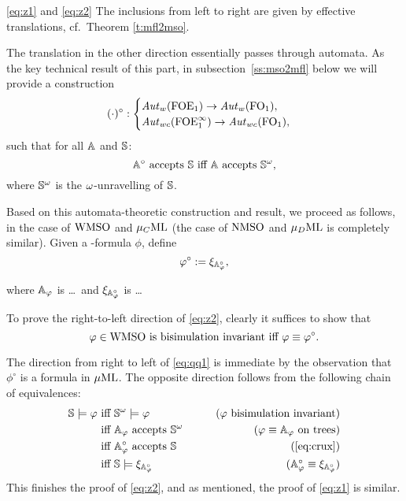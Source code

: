 \begin{proofof}{\eqref{eq:z1} and \eqref{eq:z2}}
The inclusions from left to right are given by effective translations,
cf.~Theorem \ref{t:mfl2mso}.

The translation in the other direction essentially passes through automata.
As the key technical result of this part, in subsection~\ref{ss:mso2mfl} below
we will provide a construction 
\[(\cdot)^{\circ}: \begin{cases} \mathit{Aut}_{w}(\mathrm{FOE}_1) \to
\mathit{Aut}_{w}(\mathrm{FO}_1), \\
\mathit{Aut}_{wc}(\mathrm{FOE}^{\infty}_1) \to
\mathit{Aut}_{wc}(\mathrm{FO}_1), \\
\end{cases}\] 
such that for all $\mathbb{A}$ and $\mathbb{S}$: %
\begin{equation}
\label{eq:crux}
\bbA^{\circ} \text{ accepts } \model \text{ iff } \bbA \text{ accepts
} \model^{\om},
\end{equation}
where $\mathbb{S}^{\omega}$ is the $\omega$-unravelling of $\mathbb{S}$.
 
Based on this automata-theoretic construction and result, we proceed as follows,
in the case of $\mathrm{WMSO}$ and $\mu_{C}\mathrm{ML}$ (the case of $\mathrm{NMSO}$ and $\mu_{D}\mathrm{ML}$ is 
completely similar).
Given a \wmso-formula $\phi$, define 
\[
\varphi^{\circ} \mathrel{: =} \xi_{\mathbb{A}_{\varphi}^{\circ}},
\]
\btbs
\item
where $\mathbb{A}_{\varphi}$ is \ldots\ and $\xi_{\mathbb{A}_{\varphi}^{\circ}}$ is \ldots
\etbs

To prove the right-to-left direction of \eqref{eq:z2}, clearly it suffices to
show that
\begin{equation}
\label{eq:qq1}
\phi\in\wmso \text{ is bisimulation invariant iff } \phi \equiv \phi^{\circ}.
\end{equation}

The direction from right to left of \eqref{eq:qq1} is immediate by the 
observation that $\phi^{\circ}$ is a formula in $\mu\mathrm{ML}$.
The opposite direction follows from the following chain of equivalences:
\begin{align*}
\model \models \phi
  & \text{ iff } \model^{\om} \models \phi
  & \tag{$\phi$ bisimulation invariant}
\\ & \text{ iff }  \bbA_{\phi} \text{ accepts } \model^{\om}
  & \tag{$ \phi \equiv \aut_{\phi}$ on trees}
\\ & \text{ iff } \bbA_{\phi}^{\circ} \text{ accepts } \model
& \tag{\ref{eq:crux}}
\\ & \text{ iff }  \model \models \xi_{ \aut_{\phi}^{\circ}}
& \tag{$\aut_{\phi}^{\circ}\equiv \xi_{ \aut_{\phi}^{\circ}}$}
\end{align*}
This finishes the proof of \eqref{eq:z2}, and as mentioned, the proof of
\eqref{eq:z1} is similar.
\end{proofof}

